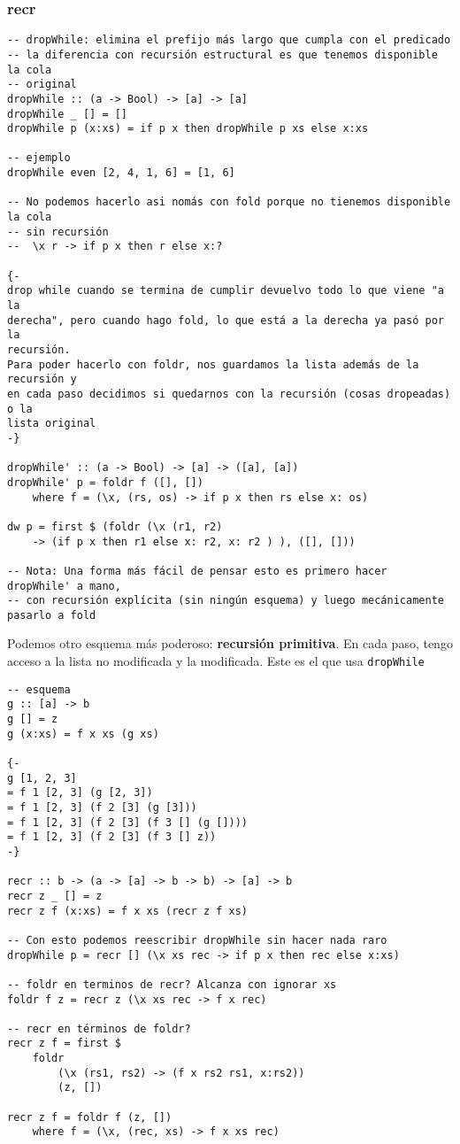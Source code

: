 \documentclass{report}
\theoremstyle{definition} %
\begin{document}
\subsubsection{recr}

\begin{verbatim}
-- dropWhile: elimina el prefijo más largo que cumpla con el predicado
-- la diferencia con recursión estructural es que tenemos disponible la cola
-- original
dropWhile :: (a -> Bool) -> [a] -> [a]
dropWhile _ [] = []
dropWhile p (x:xs) = if p x then dropWhile p xs else x:xs

-- ejemplo
dropWhile even [2, 4, 1, 6] = [1, 6]

-- No podemos hacerlo asi nomás con fold porque no tienemos disponible la cola
-- sin recursión
--  \x r -> if p x then r else x:?

{-
drop while cuando se termina de cumplir devuelvo todo lo que viene "a la
derecha", pero cuando hago fold, lo que está a la derecha ya pasó por la
recursión.
Para poder hacerlo con foldr, nos guardamos la lista además de la recursión y
en cada paso decidimos si quedarnos con la recursión (cosas dropeadas) o la
lista original
-}

dropWhile' :: (a -> Bool) -> [a] -> ([a], [a])
dropWhile' p = foldr f ([], [])
    where f = (\x, (rs, os) -> if p x then rs else x: os)

dw p = first $ (foldr (\x (r1, r2)
    -> (if p x then r1 else x: r2, x: r2 ) ), ([], []))

-- Nota: Una forma más fácil de pensar esto es primero hacer dropWhile' a mano,
-- con recursión explícita (sin ningún esquema) y luego mecánicamente pasarlo a fold

\end{verbatim}

Podemos otro esquema más poderoso: \textbf{recursión primitiva}. En cada paso,
tengo acceso a la lista no modificada y la modificada. Este es el que usa \texttt{dropWhile}

\begin{verbatim}
-- esquema
g :: [a] -> b
g [] = z
g (x:xs) = f x xs (g xs)

{-
g [1, 2, 3]
= f 1 [2, 3] (g [2, 3])
= f 1 [2, 3] (f 2 [3] (g [3]))
= f 1 [2, 3] (f 2 [3] (f 3 [] (g [])))
= f 1 [2, 3] (f 2 [3] (f 3 [] z))
-}

recr :: b -> (a -> [a] -> b -> b) -> [a] -> b
recr z _ [] = z
recr z f (x:xs) = f x xs (recr z f xs)

-- Con esto podemos reescribir dropWhile sin hacer nada raro
dropWhile p = recr [] (\x xs rec -> if p x then rec else x:xs)

-- foldr en terminos de recr? Alcanza con ignorar xs
foldr f z = recr z (\x xs rec -> f x rec)

-- recr en términos de foldr?
recr z f = first $
    foldr
        (\x (rs1, rs2) -> (f x rs2 rs1, x:rs2))
        (z, [])

recr z f = foldr f (z, [])
    where f = (\x, (rec, xs) -> f x xs rec)
\end{verbatim}
\end{document}

